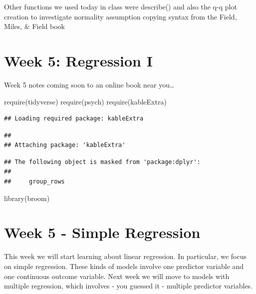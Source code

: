 \documentclass[
]{book}
\newenvironment{Shaded}{\begin{snugshade}}{\end{snugshade}}
\newcommand{\FunctionTok}[1]{\textcolor[rgb]{0.00,0.00,0.00}{#1}}
\newcommand{\NormalTok}[1]{#1}
\begin{document}
Other functions we used today in class were describe() and also the q-q plot creation to investigate normality assumption copying syntax from the Field, Miles, \& Field book

\hypertarget{week-5-regression-i}{%
\chapter{Week 5: Regression I}\label{week-5-regression-i}}

Week 5 notes coming soon to an online book near you\ldots{}

\begin{Shaded}
\begin{Highlighting}[]
\FunctionTok{require}\NormalTok{(tidyverse)}
\FunctionTok{require}\NormalTok{(psych)}
\FunctionTok{require}\NormalTok{(kableExtra)}
\end{Highlighting}
\end{Shaded}

\begin{verbatim}
## Loading required package: kableExtra
\end{verbatim}

\begin{verbatim}
## 
## Attaching package: 'kableExtra'
\end{verbatim}

\begin{verbatim}
## The following object is masked from 'package:dplyr':
## 
##     group_rows
\end{verbatim}

\begin{Shaded}
\begin{Highlighting}[]
\FunctionTok{library}\NormalTok{(broom)}
\end{Highlighting}
\end{Shaded}

\hypertarget{week-5---simple-regression}{%
\chapter{Week 5 - Simple Regression}\label{week-5---simple-regression}}

This week we will start learning about linear regression. In particular, we focus on simple regression. These kinds of models involve one predictor variable and one continuous outcome variable. Next week we will move to models with multiple regression, which involves - you guessed it - multiple predictor variables.
\end{document}
